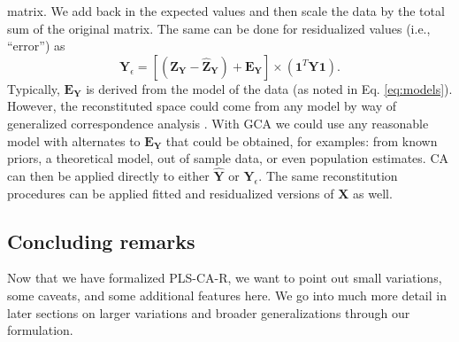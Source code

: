 \documentclass[12pt]{article}
\begin{document}
matrix. We add back in the expected values and then scale the data by
the total sum of the original matrix. The same can be done for
residualized values (i.e., ``error'') as \begin{equation}
{\mathbf Y}_{\epsilon} = [({\mathbf Z}_{\mathbf Y} - \widehat{{\mathbf Z}}_{\mathbf Y}) + {\mathbf E}_{\mathbf Y}] \times ({\mathbf 1}^{T}{\mathbf Y}{\mathbf 1}).
\label{eq:Yresid}
\end{equation} Typically, \({\mathbf E}_{\mathbf Y}\) is derived from
the model of the data (as noted in Eq. \ref{eq:models}). However, the
reconstituted space could come from any model by way of generalized
correspondence analysis
\citetext{\citealp{escofier1983analyse}; \citealp{escofier1984analyse}; \citealp[for
more details and background see also][]{beaton2018generalization}}. With
GCA we could use any reasonable model with alternates to
\({\mathbf E}_{\mathbf Y}\) that could be obtained, for examples: from
known priors, a theoretical model, out of sample data, or even
population estimates. CA can then be applied directly to either
\(\widehat{\mathbf Y}\) or \({\mathbf Y}_{\epsilon}\). The same
reconstitution procedures can be applied fitted and residualized
versions of \({\mathbf X}\) as well.

\hypertarget{concluding-remarks}{%
\subsection{Concluding remarks}\label{concluding-remarks}}

Now that we have formalized PLS-CA-R, we want to point out small
variations, some caveats, and some additional features here. We go into
much more detail in later sections on larger variations and broader
generalizations through our formulation.
\end{document}
